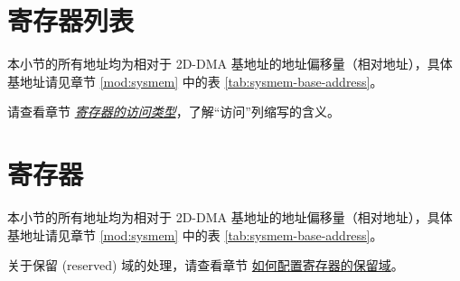 \documentclass[main\_\_CN.tex]{subfiles}
\begin{document}



\newpage
\begin{landscape}
\hypertarget{2ddma-reg-summ}{}
\section{寄存器列表}
\label{sec:2ddma-reg-summ}

本小节的所有地址均为相对于 2D-DMA 基地址的地址偏移量（相对地址），具体基地址请见章节 \ref{mod:sysmem} \textit{} 中的表 \ref{tab:sysmem-base-address}。

请查看章节 \hyperref[glossary-access-types]{\textit{寄存器的访问类型}}，了解“访问”列缩写的含义。

\end{landscape}



\newpage
\section{寄存器}

本小节的所有地址均为相对于 2D-DMA 基地址的地址偏移量（相对地址），具体基地址请见章节 \ref{mod:sysmem} \textit{} 中的表 \ref{tab:sysmem-base-address}。

关于保留 (reserved) 域的处理，请查看章节 \hyperref[programming-reserved-field]{如何配置寄存器的保留域}。

\end{document}
